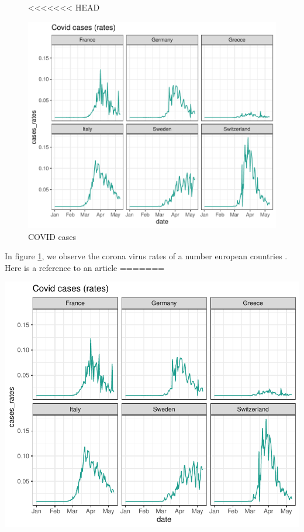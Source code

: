 \documentclass[11pt,a4paper,]{article}
\begin{document}
\begin{figure}

<<<<<<< HEAD
{\centering \includegraphics{Report_files/figure-latex/covidgraph-1} 

}

\caption{COVID cases}\label{fig:covidgraph}
\end{figure}

In figure \ref{fig:covidgraph}, we observe the corona virus rates of a number european countries . Here is a reference to an article \textcite{BC64}
=======
{\centering \includegraphics{Report_files/figure-latex/covid-europe-1} 

}
\end{document}
